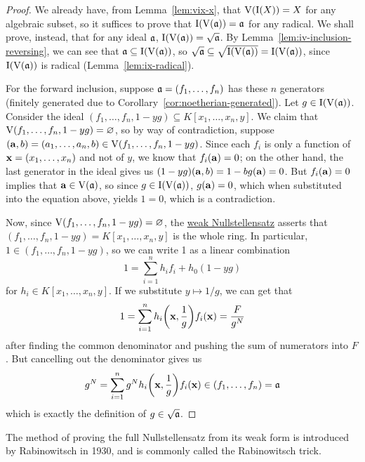 \begin{proof}
    We already have, from Lemma~\ref{lem:vix-x}, that \(\operatorname{V}(\operatorname{I}(X)) = X\) for any algebraic subset,
    so it suffices to prove that \(\operatorname{I}(\operatorname{V}(\mathfrak{a})) = \mathfrak{a}\) for any radical.
    We shall prove, instead, that for any ideal \(\mathfrak{a}\),
    \(\operatorname{I}(\operatorname{V}(\mathfrak{a})) = \sqrt{\mathfrak{a}}\).
    By Lemma~\ref{lem:iv-inclusion-reversing},
    we can see that \(\mathfrak{a} \subseteq \operatorname{I}(\operatorname{V}(\mathfrak{a}))\),
    so \(\sqrt{\mathfrak{a}} \subseteq \sqrt{\operatorname{I}(\operatorname{V}(\mathfrak{a}))} = \operatorname{I}(\operatorname{V}(\mathfrak{a}))\),
    since \(\operatorname{I}(\operatorname{V}(\mathfrak{a}))\) is radical (Lemma~\ref{lem:ix-radical}).

    For the forward inclusion,
    suppose \(\mathfrak{a} = (f_1,\hdots,f_n)\) has these \(n\) generators
    (finitely generated due to Corollary~\ref{cor:noetherian-generated}).
    Let \(g \in \operatorname{I}(\operatorname{V}(\mathfrak{a}))\).
    Consider the ideal \((f_1,\hdots,f_n,1-yg) \subseteq K[x_1,\hdots,x_n,y]\).
    We claim that \(\operatorname{V}(f_1,\hdots,f_n,1-yg) = \varnothing\),
    so by way of contradiction, suppose \((\vb{a},b) = (a_1,\hdots,a_n,b) \in \operatorname{V}(f_1,\hdots,f_n,1-yg)\).
    Since each \(f_i\) is only a function of \(\vb{x} = (x_1,\hdots,x_n)\) and not of \(y\),
    we know that \(f_i(\vb{a}) = 0\);
    on the other hand, the last generator in the ideal gives us
    \((1-yg)(\vb{a},b) = 1 - bg(\vb{a}) = 0\).
    But \(f_i(\vb{a}) = 0\) implies that \(\vb{a} \in \operatorname{V}(\mathfrak{a})\),
    so since \(g \in \operatorname{I}(\operatorname{V}(\mathfrak{a}))\), \(g(\vb{a}) = 0\),
    which when substituted into the equation above, yields \(1 = 0\), which is a contradiction.

    Now, since \(\operatorname{V}(f_1,\hdots,f_n,1-yg) = \varnothing\),
    the \hyperref[lem:weak-nullstellensatz]{weak Nullstellensatz}
    asserts that \((f_1,\hdots,f_n,1-yg) = K[x_1,\hdots,x_n,y]\) is the whole ring.
    In particular, \(1 \in (f_1,\hdots,f_n,1-yg)\),
    so we can write 1 as a linear combination
    \begin{equation*}
        1 = \sum_{i=1}^n h_i f_i + h_0(1-yg)
    \end{equation*}
    for \(h_i \in K[x_1,\hdots,x_n,y]\).
    If we substitute \(y \mapsto 1/g\), we can get that
    \begin{equation*}
        1 = \sum_{i=1}^n h_i\pqty{\vb{x},\frac{1}{g}}f_i(\vb{x}) = \frac{F}{g^N}
    \end{equation*}
    after finding the common denominator and pushing the sum of numerators into \(F\).
    But cancelling out the denominator gives us
    \begin{equation*}
        g^N = \sum_{i=1}^n g^N h_i\pqty{\vb{x},\frac{1}{g}}f_i(\vb{x})
        \in (f_1,\hdots,f_n) = \mfk{a}
    \end{equation*}
    which is exactly the definition of \(g \in \sqrt{\mathfrak{a}}\).
\end{proof}
\begin{remark}
    The method of proving the full Nullstellensatz from its weak form
    is introduced by Rabinowitsch in 1930,
    and is commonly called the Rabinowitsch trick.
\end{remark}

